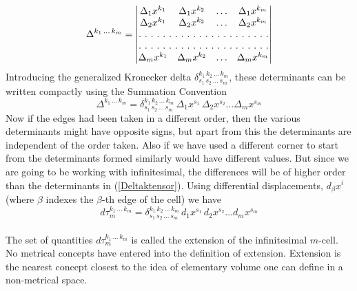 \begin{equation}
\Delta^{k_1\,...\,k_m}  =  
\begin{vmatrix}
\Delta_1 x^{k_1} & \Delta_1 x^{k_2} & \hdots & \Delta_1 x^{k_m} \\
\Delta_2 x^{k_1} & \Delta_2 x^{k_2} & \hdots & \Delta_2 x^{k_m} \\
\hdotsfor[2]{4}\\
\hdotsfor[2]{4}\\
\Delta_m x^{k_1} & \Delta_m x^{k_2} & \hdots & \Delta_m x^{k_m} \\
\end{vmatrix}\label{detDeltak}
\end{equation}
Introducing the generalized Kronecker delta $\delta^{k_1\,k_2\,...\,k_m}_{s_1\,s_2\,...\,s_m}$, these determinants can be written compactly using the Summation Convention
\begin{equation}
\Delta^{k_1\,...\,k_m}  =  \delta^{k_1\,k_2\,...\,k_m}_{s_1\,s_2\,...\,s_m}\, \Delta_1 x^{s_1}\, \Delta_2 x^{s_2} \hdots \Delta_m x^{s_m}\label{Deltaktensor}
\end{equation}
Now if the edges had been taken in a different order, then the various determinants might have opposite signs, but apart from this the determinants are independent of the order taken. 
Also if we have used a different corner to start from the determinants formed similarly would have different values. But since we are going to be working with infinitesimal, the differences 
will be of higher order than the determinants in (\ref{Deltaktensor}). Using differential displacements, $d_\beta x^i$ (where $\beta$ indexes the $\beta$-th edge of the cell) we have
\begin{equation}
d\tau_m^{k_1\,...\,k_m}  =  \delta^{k_1\,k_2\,...\,k_m}_{s_1\,s_2\,...\,s_m}\, d_1 x^{s_1}\, d_2 x^{s_2} \hdots d_m x^{s_m}\label{tauTensor}
\end{equation}\\
The set of quantities $d\tau_m^{k_1\,...\,k_m}$ is called the {\elevenit extension} of the infinitesimal $m$-cell. No metrical concepts have entered into the definition of extension. Extension is the 
nearest concept closest to the idea of elementary volume one can define in a non-metrical space. \\

